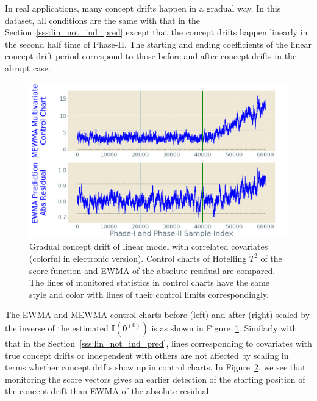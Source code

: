 \documentclass[twoside,11pt]{article}
\begin{document}
\begin{enumerate}[(I)]
\begin{figure}[!htbp]
  \label{fig:lin_reg_not_ind_X_grad_cd}
\end{figure}
In real applications, many concept drifts happen in a gradual way. In this dataset, all conditions are the same with that in the Section~\ref{sss:lin_not_ind_pred} except that the concept drifts happen linearly in the second half time of Phase-II. The starting and ending coefficients of the linear concept drift period correspond to those before and after concept drifts in the abrupt case. 
\begin{figure}[!htbp]
\centering
\includegraphics[width = 0.6\linewidth]{../figures/v14/sim_6/reg/1_sim6_lin_1e-08_0_005_1.png}
  \caption{Gradual concept drift of linear model with correlated covariates (colorful in electronic version). Control charts of Hotelling $T^2$ of the score function and EWMA of the absolute residual are compared. The lines of monitored statistics in control charts have the same style and color with lines of their control limits correspondingly.}
  \label{fig:lin_reg_ind_X_grad_cd_comp}
\end{figure}

The EWMA and MEWMA control charts before (left) and after (right) scaled by {the inverse of the estimated} ${\mathbf {I}}(\bm { \theta}^{(0)})$ is as shown in Figure~\ref{fig:lin_reg_not_ind_X_grad_cd}. Similarly with that in the Section~\ref{sss:lin_not_ind_pred}, lines corresponding to covariates with true concept drifts or independent with others are not affected by scaling in terms whether concept drifts show up in control charts. In Figure~\ref{fig:lin_reg_ind_X_grad_cd_comp}, we see that monitoring the score vectors gives an earlier detection of the starting position of the concept drift than EWMA of the absolute residual.
\end{enumerate}
\end{document}
